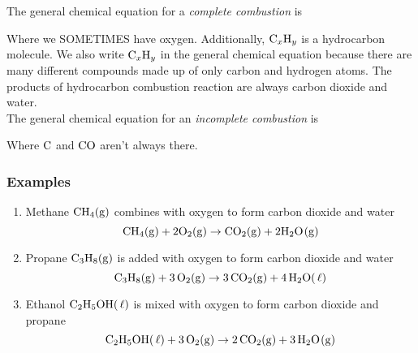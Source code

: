 \documentclass[12pt]{report}
\begin{document}
The general chemical equation for a \textit{complete combustion} is 

\begin{center}
\end{center}

Where we SOMETIMES have oxygen. Additionally, $ \ce{C_xH_y}$ is a hydrocarbon molecule. We also write $ \ce{C_xH_y}$ in the general chemical equation because there are many different compounds made up of only carbon and hydrogen atoms. The products of hydrocarbon combustion reaction are always carbon dioxide and water. \\

The general chemical equation for an \textit{incomplete combustion} is 
\begin{center}
\end{center}

Where $\ce{C}$ and $\ce{CO}$ aren't always there.

\subsubsection{Examples}
\begin{enumerate}
\setlength\itemsep{0.5em}
    \item{Methane $ \ce{CH4(g)}$ combines with oxygen to form carbon dioxide and water
            \[
                \ce{CH4(g)}+ 2\ce{O2(g)}\to \ce{CO2(g)}+ 2\ce{H2O(g)} 
            \]
        }
    \item{Propane $ \ce{C3H8(g)}$ is added with oxygen to form carbon dioxide and water 
            \[
                \ce{C3H8(g)}+ \ce{3O2(g)}\to \ce{3CO2(g)}+ \ce{4H2O( \ell )}
            \]
        }
    \item{Ethanol $ \ce{C2H5OH( \ell )}$ is mixed with oxygen to form carbon dioxide and propane 
            \[
                \ce{C2H5OH( \ell )}+ \ce{3O2(g)}\to \ce{2CO2(g)}+ \ce{3H2O(g)}
            \]
        }
\end{enumerate}
\end{document}
